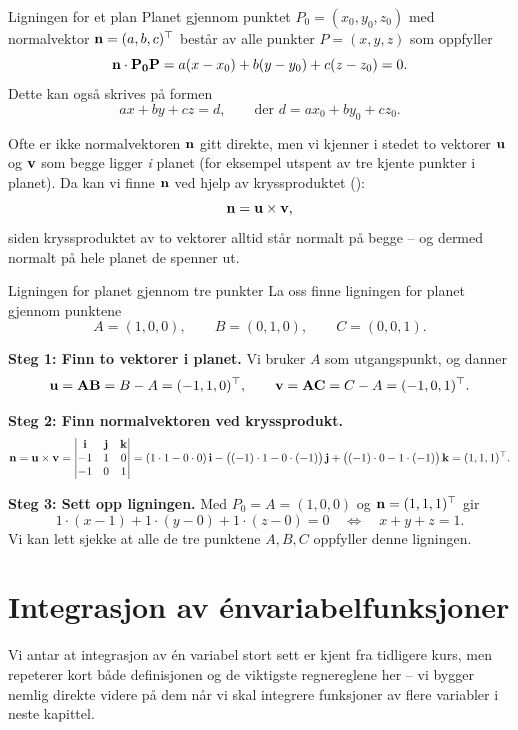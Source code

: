 \begin{defn}{Ligningen for et plan}
Planet gjennom punktet $P_0=(x_0,y_0,z_0)$ med normalvektor $\mathbf{n}=(a,b,c)^\top$ består av alle punkter $P=(x,y,z)$ som oppfyller
\[
\mathbf{n}\cdot \mathbf{P_0P} = a(x-x_0)+b(y-y_0)+c(z-z_0) = 0.
\]
Dette kan også skrives på formen
\[
ax+by+cz=d, \qquad \text{der } d = ax_0+by_0+cz_0.
\]
\label{defn:plan-likning}
\end{defn}

\begin{rem}{}
Ofte er ikke normalvektoren $\mathbf{n}$ gitt direkte, men vi kjenner i stedet to vektorer $\mathbf{u}$ og $\mathbf{v}$ som begge ligger \emph{i} planet (for eksempel utspent av tre kjente punkter i planet). Da kan vi finne $\mathbf{n}$ ved hjelp av kryssproduktet ():
\[
\mathbf{n} = \mathbf{u}\times\mathbf{v},
\]
siden kryssproduktet av to vektorer alltid står normalt på begge -- og dermed normalt på hele planet de spenner ut.
\end{rem}

\begin{eks}{Ligningen for planet gjennom tre punkter}
La oss finne ligningen for planet gjennom punktene
\[
A=(1,0,0), \qquad B=(0,1,0), \qquad C=(0,0,1).
\]

\textbf{Steg 1: Finn to vektorer i planet.} Vi bruker $A$ som utgangspunkt, og danner
\[
\mathbf{u} = \mathbf{AB} = B-A = (-1,1,0)^\top, \qquad \mathbf{v} = \mathbf{AC} = C-A = (-1,0,1)^\top.
\]

\textbf{Steg 2: Finn normalvektoren ved kryssprodukt.}
\[
\mathbf{n} = \mathbf{u}\times\mathbf{v} = \begin{vmatrix}\mathbf{i} & \mathbf{j} & \mathbf{k} \\ -1 & 1 & 0 \\ -1 & 0 & 1\end{vmatrix} = (1\cdot 1 - 0\cdot 0)\,\mathbf{i} - \bigl((-1)\cdot 1 - 0\cdot(-1)\bigr)\,\mathbf{j} + \bigl((-1)\cdot 0 - 1\cdot(-1)\bigr)\,\mathbf{k} = (1,1,1)^\top.
\]

\textbf{Steg 3: Sett opp ligningen.} Med $P_0=A=(1,0,0)$ og $\mathbf{n}=(1,1,1)^\top$ gir 
\[
1\cdot(x-1) + 1\cdot(y-0) + 1\cdot(z-0) = 0 \quad\Longleftrightarrow\quad x+y+z=1.
\]
Vi kan lett sjekke at alle de tre punktene $A,B,C$ oppfyller denne ligningen. \checkmark
\end{eks}

\section{Integrasjon av énvariabelfunksjoner}
Vi antar at integrasjon av én variabel stort sett er kjent fra tidligere kurs, men repeterer kort både definisjonen og de viktigste regnereglene her -- vi bygger nemlig direkte videre på dem når vi skal integrere funksjoner av flere variabler i neste kapittel.

